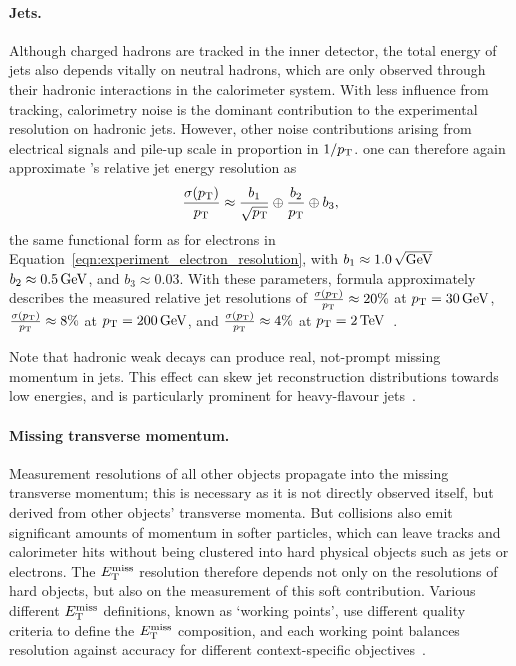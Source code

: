 \paragraph{Jets.}
Although charged hadrons are tracked in the inner detector, the total energy of
jets also depends vitally on neutral hadrons, which are only observed through
their hadronic interactions in the calorimeter system.
With less influence from tracking, calorimetry noise is the dominant
contribution to the experimental resolution on hadronic jets.
However, other noise contributions arising from electrical signals and pile-up
scale in proportion in $1/\pt$.
one can therefore again approximate \atlas's relative jet energy resolution as
\begin{equation}
\label{eqn:experiment_jet_resolution}
\frac{\sigma(\pt)}{\pt}
\approx
\frac{b_1}{\sqrt{\pt}}
\oplus
\frac{b_2}{\pt}
\oplus
b_3
,
\end{equation}
the same functional form as for electrons in
Equation~\ref{eqn:experiment_electron_resolution},
with
$b_1 \approx 1.0\,\sqrt{\eV[G]}$
$b_2 \approx 0.5\,\eV[G]$, and
$b_3 \approx 0.03$.
With these parameters, formula approximately describes the measured relative
jet resolutions of
$\frac{\sigma(\pt)}{\pt} \approx 20\%$ at $\pt = 30\,\eV[G]$,
$\frac{\sigma(\pt)}{\pt} \approx 8\%$ at $\pt = 200\,\eV[G]$, and
$\frac{\sigma(\pt)}{\pt} \approx 4\%$ at
$\pt = 2\,\eV[T]$~\cite{atlas2021jetresolution}.

Note that hadronic weak decays can produce real, not-prompt missing momentum
in jets.
This effect can skew jet reconstruction distributions towards low energies,
and is particularly prominent for heavy-flavour jets~\cite{nackenhorst2010top}.

\paragraph{Missing transverse momentum.}
Measurement resolutions of all other objects propagate into the missing
transverse momentum; this is necessary as it is not directly observed itself,
but derived from other objects' transverse momenta.
But collisions also emit significant amounts of momentum in softer particles,
which can leave tracks and calorimeter hits without being clustered into hard
physical objects such as jets or electrons.
The $\met$ resolution therefore depends not only on the resolutions of hard
objects, but also on the measurement of this soft contribution.
Various different $\met$ definitions, known as `working points', use different
quality criteria to define the $\met$ composition, and each working point
balances resolution against accuracy for different context-specific
objectives~\cite{ATLAS-CONF-2018-023, Pacey:2747774}.

